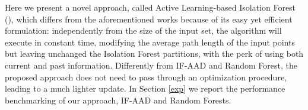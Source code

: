 Here we present a novel approach, called Active Learning-based Isolation Forest (\approach), which differs from the aforementioned works because of its easy yet efficient formulation: independently from the size of the input set, the algorithm will execute in constant time, modifying the average path length of the input points but leaving unchanged the Isolation Forest partitions, with the perk of using both current and past information. Differently from IF-AAD and Random Forest, the proposed approach does not need to pass through an optimization procedure, leading to a much lighter update.  In Section \ref{exp} we report the performance benchmarking of our approach, IF-AAD and Random Forests.
